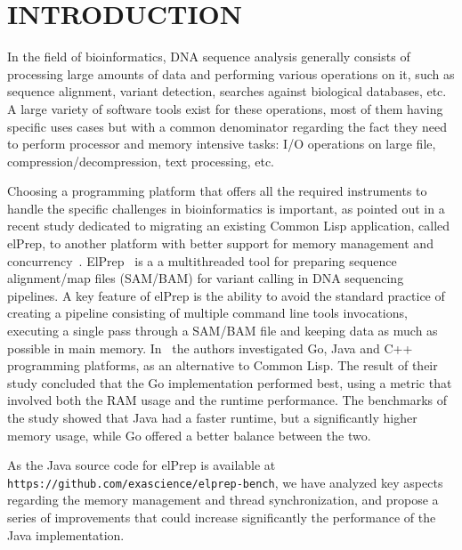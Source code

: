 \documentclass[a4paper,twoside]{article}
\begin{document}
\section{\uppercase{Introduction}}
\label{intro}

In the field of bioinformatics, DNA sequence analysis generally consists of processing large amounts of data and performing various operations on it, 
such as sequence alignment, variant detection, searches against biological databases, etc.
A large variety of software tools exist for these operations, most of them having specific uses cases but with a common denominator regarding the fact they need to perform processor and memory intensive tasks: I/O operations on large file, compression/decompression, text processing, etc.

Choosing a programming platform that offers all the required instruments to handle the specific challenges in bioinformatics is important, 
as pointed out in a recent study dedicated to migrating an existing Common Lisp application, called elPrep, 
to another platform with better support for memory management and concurrency~\cite{costanza:2019}.
ElPrep~\cite{herzeel:2019} is a a multithreaded tool for preparing sequence alignment/map files (SAM/BAM)
for variant calling in DNA sequencing pipelines. 
A key feature of elPrep is the ability to avoid the standard practice of creating a pipeline consisting of multiple command line tools invocations, 
executing a single pass through a SAM/BAM file and keeping data as much as possible in main memory.
In~\cite{costanza:2019} the authors investigated Go, Java and C++ programming platforms, as an alternative to Common Lisp.
The result of their study concluded that the Go implementation performed best, using a metric that involved both the RAM usage and the runtime performance.
The benchmarks of the study showed that Java had a faster runtime, but a significantly higher memory usage, while Go offered a better balance between the two.

As the Java source code for elPrep is available at {\texttt{https://github.com/exascience/elprep-bench}}, we have analyzed key aspects regarding the memory management and
thread synchronization, and propose a series of improvements that could increase significantly the performance of the Java implementation. 
\end{document}
